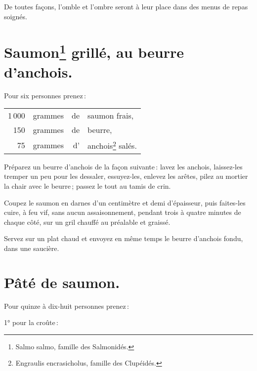 De toutes façons, l'omble et l'ombre seront à leur place dans des menus de
repas soignés.

\section*{\centering Saumon\footnote{Salmo salmo, famille des Salmonidés.} grillé, au beurre d'anchois.}

\medskip

Pour six personnes prenez :

\medskip

\footnotesize
\begin{longtable}{rrrp{16em}}
  1 000 & grammes & de & saumon frais,                                                                    \\
    150 & grammes & de & beurre,                                                                          \\
     75 & grammes & d' & anchois\footnote{Engraulis encrasicholus, famille des Clupéidés.} salés.         \\
\end{longtable}
\normalsize

\label{pg0337} \hypertarget{p0337}{}
Préparez un beurre d'anchois de la façon suivante : lavez les anchois,
laissez-les tremper un peu pour les dessaler, essuyez-les, enlevez les arêtes,
pilez au mortier la chair avec le beurre ; passez le tout au tamis de crin.

Coupez le saumon en darnes d’un centimètre et demi d'épaisseur, puis faites-les
cuire, à feu vif, sans aucun assaisonnement, pendant trois à quatre minutes de
chaque côté, sur un gril chauffé au préalable et graissé.

Servez sur un plat chaud et envoyez en même temps le beurre d'anchois fondu,
dans une saucière.

\section*{\centering Pâté de saumon.}
\label{pg0338} \hypertarget{p0338}{}

Pour quinze à dix-huit personnes prenez :

\medskip

1° pour la croûte :

